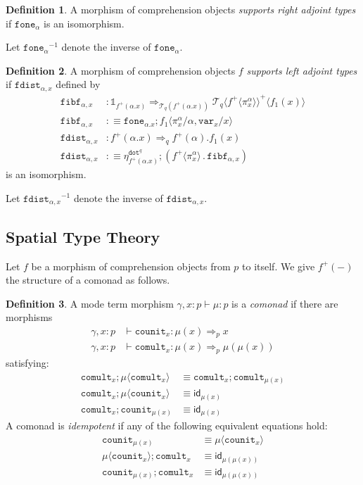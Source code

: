 \documentclass[10pt]{article}
\theoremstyle{definition}
\newtheorem{definition}{Definition}
\newcommand{\yields}{\vdash}
\newcommand{\tcell}{\Rightarrow}
\newcommand{\id}{\mathsf{id}}
\newcommand\TrPlus[2]{\ensuremath{{#1}^+(#2)}}
\newcommand\El[2]{\mathcal{T}_{#1}(#2)}
\newcommand\ApEl[2]{\mathcal{T}_{#1}\langle#2\rangle}
\newcommand\bdot[0]{\mathbin{.}}
\newcommand\ap[2]{\ensuremath{#1 \langle #2 \rangle }}
\newcommand\ApPlus[2]{\ensuremath{{#1}^+ \langle #2 \rangle }}
\newcommand{\tdot}{\ensuremath{\mathtt{dot}}}
\newcommand\One{\ensuremath{\mathds{1}}}
\newcommand\var[1]{\ensuremath{\mathtt{var}_{#1}}}
\newcommand\fone[1]{\ensuremath{\mathtt{fone}_{#1}}}
\newcommand\fibf[1]{\ensuremath{\mathtt{fibf}_{#1}}}
\newcommand\foneinv[1]{\ensuremath{\fone{#1}^{-1}}}
\newcommand\fdist[1]{\ensuremath{\mathtt{fdist}_{#1}}}
\newcommand\fdistinv[1]{\ensuremath{\fdist{#1}^{-1}}}
\newcommand\fcomult[1]{\ensuremath{\mathtt{comult}_{#1}}}
\newcommand\fcounit[1]{\ensuremath{\mathtt{counit}_{#1}}}
\begin{document}
\begin{definition}
A morphism of comprehension objects \emph{supports right adjoint types} if $\fone{\alpha}$ is an isomorphism.
\end{definition}
Let $\foneinv{\alpha}$ denote the inverse of $\fone{\alpha}$.

\begin{definition}
A morphism of comprehension objects $f$ \emph{supports left adjoint types} if $\fdist{\alpha, x}$ defined by
\begin{align*}
\fibf{\alpha, x} &: \One_{\TrPlus{f}{\alpha.x}} \tcell_{\El{q}{\TrPlus{f}{\alpha.x}}} \ApPlus{\ApEl{q}{\ApPlus{f}{\pi^\alpha_x}}}{f_1(x)} \\
\fibf{\alpha, x} &:\equiv \fone{\alpha.x};\ap{f_1}{\pi^\alpha_x/\alpha, \var{x}/x} \\
\fdist{\alpha, x} &: \TrPlus{f}{\alpha.x} \tcell_q \TrPlus{f}{\alpha}.f_1(x) \\
\fdist{\alpha, x} &:\equiv \eta^{\tdot^q}_{\TrPlus{f}{\alpha.x}} ; (\ApPlus{f}{\pi^\alpha_x} \bdot \fibf{\alpha, x})
\end{align*}
is an isomorphism.
\end{definition}
Let $\fdistinv{\alpha,x}$ denote the inverse of $\fdist{\alpha,x}$.

\subsection{Spatial Type Theory}

Let $f$ be a morphism of comprehension objects from $p$ to itself. We give $\TrPlus{f}{-}$ the structure of a comonad as follows.

\begin{definition}
A mode term morphism $\gamma, x : p \yields \mu : p$ is a \emph{comonad} if there are morphisms
\begin{align*}
\gamma, x : p &\yields \fcounit{x} : \mu(x) \Rightarrow_p x \\
\gamma, x : p &\yields \fcomult{x} : \mu(x) \Rightarrow_p \mu(\mu(x))
\end{align*}
satisfying:
\begin{align}
\fcomult{x};\ap{\mu}{\fcomult{x}} &\equiv \fcomult{x};\fcomult{\mu(x)} \\
\fcomult{x};\ap{\mu}{\fcounit{x}} &\equiv \id_{\mu(x)} \\
\fcomult{x};\fcounit{\mu(x)} &\equiv \id_{\mu(x)}
\end{align}
A comonad is \emph{idempotent} if any of the following equivalent equations hold:
\begin{align}
\fcounit{\mu(x)} &\equiv \ap{\mu}{\fcounit{x}} \\
\ap{\mu}{\fcounit{x}} ; \fcomult{x} &\equiv \id_{\mu(\mu(x))} \\
\fcounit{\mu(x)} ; \fcomult{x} &\equiv \id_{\mu(\mu(x))} 
\end{align}
\end{definition}
\end{document}
